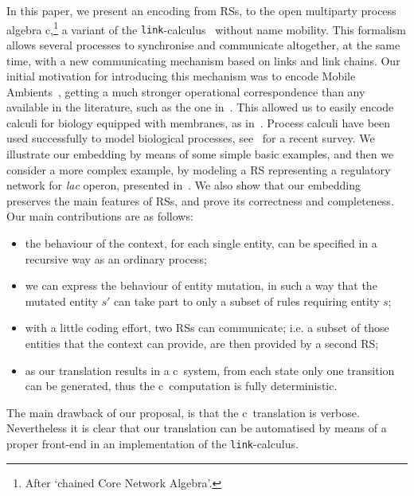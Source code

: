 In this paper, we present an encoding from RSs, 
to the open multiparty process algebra c\CNA,\footnote{After `chained Core Network 
Algebra'.} a variant of the {\tt link}-calculus~\cite{BodeiBB12,BBB17} without name mobility.
This formalism allows several processes to synchronise and 
communicate altogether, at the same time, with a new communicating
mechanism based on links and link chains. 
Our initial motivation for introducing this mechanism was to encode
Mobile Ambients~\cite{CardelliG00}, getting a much stronger operational
correspondence than any available in the literature, such as the one in~\cite{B16}.
 This allowed us to easily encode calculi for biology equipped with membranes, as in~\cite{BodeiBBC14}.
Process calculi have been used successfully to model
biological processes, see~\cite{BBDFH18} for a recent survey.
We illustrate our embedding by means of some simple basic examples,
and then we consider a more complex example, by modeling a RS 
representing a regulatory network for \emph{lac} operon, presented in~\cite{CMMBM12}. We also show that our embedding preserves the main
features of RSs, and prove its correctness and completeness.
Our main contributions are as follows:
\begin{itemize}
\item the behaviour of the context, for each single 
entity,
can be
specified in a recursive way as an ordinary process;
\item we can express the behaviour of entity mutation,
in such a way that the mutated entity
$s'$ can  take part to only a subset of rules requiring entity $s$;
\item with a little coding effort, two RSs can
communicate; i.e.  a subset of those entities that the context  can
provide, are then provided by a second RS;
\item as our translation results in  a  c\CNA \ system, from
each state only one transition can be generated, thus the c\CNA \
computation is fully deterministic.
\end{itemize}

The main drawback of our proposal, is that the c\CNA \ translation is
verbose. Nevertheless it is clear that our
translation can be automatised by means of a proper front-end in
an implementation of the {\tt link}-calculus.

